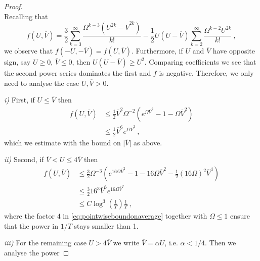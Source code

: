 \documentclass[a4paper]{amsart}
\providecommand{\abs}[1]{\lvert #1 \rvert}
\begin{document}
\begin{proof}
\begin{equation*}
  \end{equation*}
  Recalling that
  \begin{equation*}
    f(U, \overline{V})
    =
    \frac{3}{2}
    \sum_{k = 3}^\infty
    \frac{\Omega^{k - 3} (U^{2 k} - \overline{V}^{2 k})}{k!}
    -
    \frac{1}{2}
    U (U - \overline{V})
    \sum_{k = 2}^\infty
    \frac{\Omega^{k - 2} U^{2 k}}{k!}
    \ ,
  \end{equation*}
  we observe that $f(-U, -\overline{V}) = f(U, \overline{V})$.
  Furthermore, if $U$ and $\overline{V}$ have opposite sign, say $U
  \geq 0$, $\overline{V} \leq 0$, then $U (U - \overline{V}) \geq
  U^2$. Comparing coefficients we see that the second power series
  dominates the first and $f$ is negative. Therefore, we only need to
  analyse the case $U, \overline{V} > 0$.
  \par
  \textit{i)}
  First, if $U \leq \overline{V}$ then
  \begin{equation*}
    \begin{split}
      f(U, \overline{V})
      &\leq
      \frac{1}{2} \overline{V}^2 \Omega^{-2}
      (e^{\Omega \overline{V}^2} - 1 - \Omega \overline{V}^2) \\
      &\leq
      \frac{1}{2} \overline{V}^6 e^{\Omega \overline{V}^2} \ ,
    \end{split}
  \end{equation*}
  which we estimate with the bound on $\abs{\overline{V}}$ as above.
  \par
  \textit{ii)}
  Second, if $\overline{V} < U \le 4 \overline{V}$ then
  \begin{equation*}
    \begin{split}
      f(U, \overline{V})
      &\leq
      \frac{3}{2} \Omega^{-3}
      \left(
        e^{16 \Omega \overline{V}^2} - 1 - 16 \Omega \overline{V}^2 -
        \frac{1}{2} (16 \Omega)^2 \overline{V}^4
      \right) \\
      &\leq
      \frac{3}{2} 16^3 \overline{V}^6 e^{16 \Omega \overline{V}^2} \\
      &\leq
      C \log^3 \left( \frac{1}{T} \right) \frac{1}{T} \ ,
    \end{split}
  \end{equation*}
  where the factor $4$ in \eqref{eq:pointwiseboundonaverage} together
  with $\Omega \leq 1$ ensure that the power in $1 / T$ stays smaller
  than 1.
  \par
  \textit{iii)}
  For the remaining case $U > 4 \overline{V}$ we write $\overline{V} =
  \alpha U$, i.e. $\alpha < 1/4$. Then we analyse the power

\end{proof}
\end{document}
